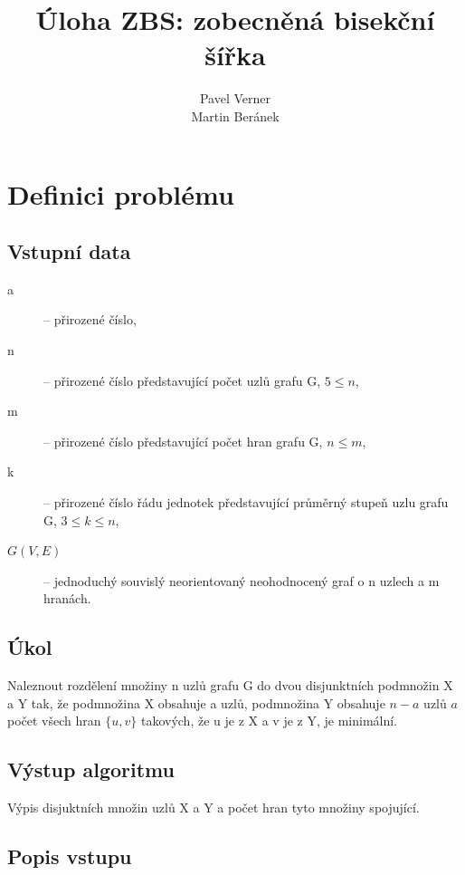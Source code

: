 \documentclass[a4paper,10pt]{report}
\begin{document}
\title{Úloha ZBS: zobecněná bisekční šířka}
\author{Pavel Verner \\ Martin Beránek}
\maketitle

\tableofcontents
\listoffigures
\listoftables
\newpage

\section{Definici problému}

\subsection{Vstupní data}

\begin{description}
	\item[a] -- přirozené číslo,
	\item[n] -- přirozené číslo představující počet uzlů grafu G, $5 \leq n$,
	\item[m] -- přirozené číslo představující počet hran grafu G, $n \leq m$,
	\item[k] -- přirozené číslo řádu jednotek představující průměrný stupeň uzlu grafu G, $3 \leq k \leq n$,
	\item[$G(V,E)$] -- jednoduchý souvislý neorientovaný neohodnocený graf o n uzlech a m hranách.
\end{description}

\subsection{Úkol}

Naleznout rozdělení množiny n uzlů grafu G do dvou disjunktních podmnožin X a Y tak, že podmnožina X obsahuje a uzlů, podmnožina Y obsahuje $n-a$ uzlů $a$ počet všech hran $\{u,v\}$ takových, že u je z X a v je z Y, je minimální.

\subsection{Výstup algoritmu}

Výpis disjuktních množin uzlů X a Y a počet hran tyto množiny spojující.

\subsection{Popis vstupu}
\end{document}
